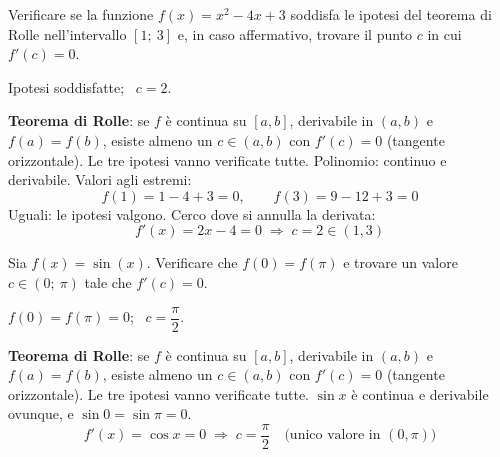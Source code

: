 \begin{question}[ID=1.1, subtitle={Teorema di Rolle per $f(x)=x^2-4x+3$ su $[1,3]$}, tags={rolle, teoremi}, difficulty=facile]
Verificare se la funzione \(f(x) = x^2 - 4x + 3\) soddisfa le ipotesi del teorema di Rolle nell'intervallo \([1;\ 3]\) e, in caso affermativo, trovare il punto \(c\) in cui \(f'(c) = 0\).
\begin{solution}
Ipotesi soddisfatte; \ $c=2$.
\end{solution}
\begin{explanation}
\textbf{Teorema di Rolle}: se $f$ è continua su $[a,b]$, derivabile in $(a,b)$ e $f(a)=f(b)$, esiste almeno un $c\in(a,b)$ con $f'(c)=0$ (tangente orizzontale). Le tre ipotesi vanno verificate tutte.
Polinomio: continuo e derivabile. Valori agli estremi:
\[ f(1)=1-4+3=0, \qquad f(3)=9-12+3=0 \]
Uguali: le ipotesi valgono. Cerco dove si annulla la derivata:
\[ f'(x)=2x-4=0 \;\Rightarrow\; c=2\in(1,3) \]
\end{explanation}
\end{question}


\begin{question}[ID=1.2, subtitle={Teorema di Rolle per $\sin(x)$ su $[0,\pi]$}, tags={rolle, teoremi}, difficulty=facile]
Sia \(f(x) = \sin(x)\). Verificare che \(f(0) = f(\pi)\) e trovare un valore \(c \in (0;\ \pi)\) tale che \(f'(c) = 0\).
\begin{solution}
$f(0)=f(\pi)=0$; \ $c=\dfrac\pi2$.
\end{solution}
\begin{explanation}
\textbf{Teorema di Rolle}: se $f$ è continua su $[a,b]$, derivabile in $(a,b)$ e $f(a)=f(b)$, esiste almeno un $c\in(a,b)$ con $f'(c)=0$ (tangente orizzontale). Le tre ipotesi vanno verificate tutte.
$\sin x$ è continua e derivabile ovunque, e $\sin0=\sin\pi=0$.
\[ f'(x)=\cos x=0 \;\Rightarrow\; c=\dfrac\pi2 \quad \text{(unico valore in $(0,\pi)$)} \]
\end{explanation}
\end{question}


